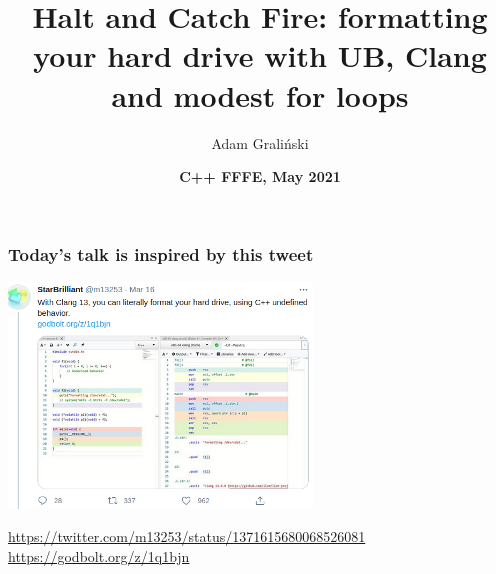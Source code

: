 \documentclass[aspectratio=169]{beamer}
\title[LTN05 :: HCF!]{Halt and Catch Fire: formatting your hard drive with UB, Clang and modest for loops}
\author{Adam Graliński}
\date[FFFE\_21]{\textbf{C++ {\color{red}F}{\color{blue}F}{\color{green}F}{\color{yellow}E}, May 2021}}
\begin{document}
{
\begin{frame}
\titlepage{}
\end{frame}
}

\begin{frame}
\frametitle{Today's talk is inspired by this tweet}
{\centering
\includegraphics[height=6cm]{pics/StarBrilliantTweet.png}

{\tiny
\url{https://twitter.com/m13253/status/1371615680068526081} \\
\url{https://godbolt.org/z/1q1bjn}
}

}
\end{frame}
\end{document}
